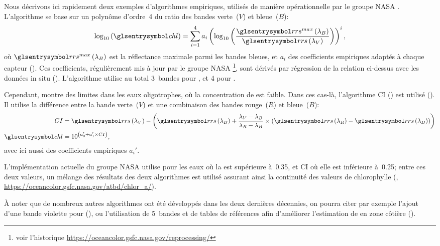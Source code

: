 \begin{technique}
Nous décrivons ici rapidement deux exemples d'algorithmes empiriques, utilisés de manière opérationnelle par le groupe NASA .
L'algorithme  se base sur un polynôme d'ordre~4 du ratio des bandes verte~(\(V\)) et bleue~(\(B\)):
\begin{equation} \label{eq:ocx}
  \log_{10}\paren{\am{chl}} =
  \sum_{i=1}^{4} a_i \paren{\log_{10}\paren{
      \frac{ \am{rrs}^{max}\paren{\lambda_B} }
           { \am{rrs}\paren{\lambda_V} }
    }}^i ,
\end{equation}
où \(\am{rrs}^{max}\paren{\lambda_B}\) est la réflectance maximale parmi les bandes bleues, et \(a_i\) des coefficients empiriques adaptés à chaque capteur (\cite{oreilly_1998,oreilly_2000}).
Ces coefficients, régulièrement mis à jour par le groupe NASA \footnote{voir l'historique \url{https://oceancolor.gsfc.nasa.gov/reprocessing/}}, sont dérivés par régression de la relation ci-dessus avec les données in situ  (\cite{werdell_2005}).
L'algorithme utilise au total 3~bandes pour , et 4 pour .

Cependant,  montre des limites dans les eaux oligotrophes, où la concentration de  est faible.
Dans ces cas-là, l'algorithme CI () est utilisé (\cite{hu_2012}).
Il utilise la différence entre la bande verte~(\(V\)) et une combinaison des bandes rouge~(\(R\)) et bleue~(\(B\)):
\begin{equation}
  \label{eq:CI}
  \begin{split}
    CI &= \am{rrs}\paren{\lambda_V} -
         \paren{
          \am{rrs}\paren{\lambda_B}
          + \frac {\lambda_V - \lambda_B}
                  {\lambda_R - \lambda_B}
          \times \paren{\am{rrs}\paren{\lambda_R}
                      - \am{rrs}\paren{\lambda_B}}
         }
    \\
    \am{chl} &= 10^{\paren{a_0' + a_1' \times CI}},
  \end{split}
\end{equation}
avec ici aussi des coefficients empiriques \(a_i'\).

L'implémentation actuelle du groupe NASA  utilise  pour les eaux où la  est supérieure à~\qty{0.35}{\mgm}, et CI où elle est inférieure à~\qty{0.25}{\mgm}; entre ces deux valeurs, un mélange des résultats des deux algorithmes est utilisé assurant ainsi la continuité des valeurs de chlorophylle (\cite{oreilly_2019}, \url{https://oceancolor.gsfc.nasa.gov/atbd/chlor_a/}).

À noter que de nombreux autres algorithmes ont été développés dans les deux dernières décennies, on pourra citer par exemple l'ajout d'une bande violette pour  (\cite{oreilly_2019}), ou l'utilisation de 5~bandes et de tables de références afin d'améliorer l'estimation de  en zone côtière (\cite{gohin_2002}).
\end{technique}

